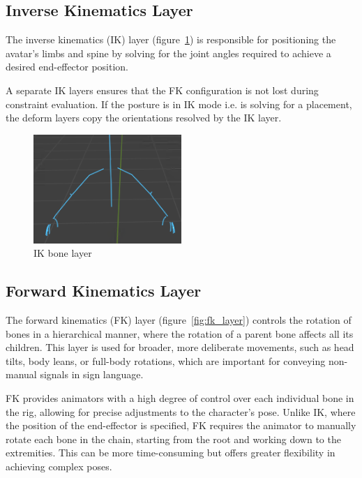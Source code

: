 \documentclass[../../main.tex]{subfiles}
\begin{document}
\subsection{Inverse Kinematics Layer}
\label{ch:rigging_layers:proc_rig_signing_avatars:ik_layer}

The inverse kinematics (IK) layer (figure~\ref{fig:ik_layer}) is responsible for positioning the avatar's limbs and spine by solving for the joint angles required to achieve a desired end-effector position.

A separate IK layers ensures that the FK configuration is not lost during constraint evaluation. If the posture is in IK mode i.e. is solving for a placement, the deform layers copy the orientations resolved by the IK layer.

\begin{figure}
    \centering
    \includegraphics[width=0.5\textwidth]{chapters/rigging_layers/images/ik_layer.png}
    \caption{IK bone layer}
    \label{fig:ik_layer}
\end{figure}

\subsection{Forward Kinematics Layer}
\label{ch:rigging_layers:proc_rig_signing_avatars:fk_layer}

The forward kinematics (FK) layer (figure~\ref{fig:fk_layer}) controls the rotation of bones in a hierarchical manner, where the rotation of a parent bone affects all its children. This layer is used for broader, more deliberate movements, such as head tilts, body leans, or full-body rotations, which are important for conveying non-manual signals in sign language.

FK provides animators with a high degree of control over each individual bone in the rig, allowing for precise adjustments to the character's pose. Unlike IK, where the position of the end-effector is specified, FK requires the animator to manually rotate each bone in the chain, starting from the root and working down to the extremities. This can be more time-consuming but offers greater flexibility in achieving complex poses.
\end{document}
